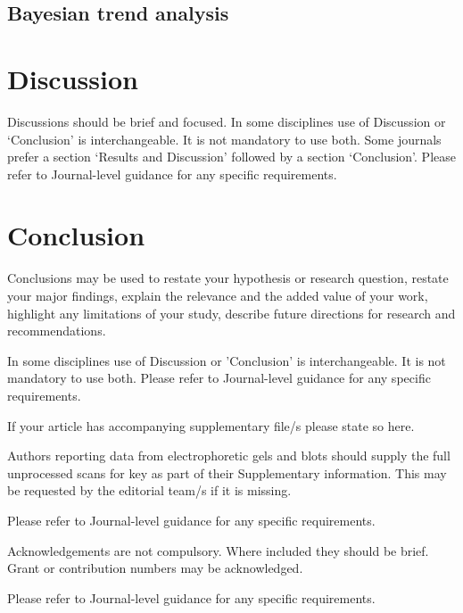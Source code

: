 \documentclass[lineno,pdflatex,sn-nature]{sn-jnl}%
\theoremstyle{thmstyleone}%
\theoremstyle{thmstyletwo}%
\theoremstyle{thmstylethree}%
\begin{document}
\subsection{Bayesian trend analysis}\label{sec:Bayesian trend analysis}

\section{Discussion}\label{sec12}

Discussions should be brief and focused. In some disciplines use of Discussion or `Conclusion' is interchangeable. It is not mandatory to use both. Some journals prefer a section `Results and Discussion' followed by a section `Conclusion'. Please refer to Journal-level guidance for any specific requirements. 

\section{Conclusion}\label{sec13}

Conclusions may be used to restate your hypothesis or research question, restate your major findings, explain the relevance and the added value of your work, highlight any limitations of your study, describe future directions for research and recommendations. 

In some disciplines use of Discussion or 'Conclusion' is interchangeable. It is not mandatory to use both. Please refer to Journal-level guidance for any specific requirements. 

\backmatter


If your article has accompanying supplementary file/s please state so here. 

Authors reporting data from electrophoretic gels and blots should supply the full unprocessed scans for key as part of their Supplementary information. This may be requested by the editorial team/s if it is missing.

Please refer to Journal-level guidance for any specific requirements.


Acknowledgements are not compulsory. Where included they should be brief. Grant or contribution numbers may be acknowledged.

Please refer to Journal-level guidance for any specific requirements.
\end{document}
